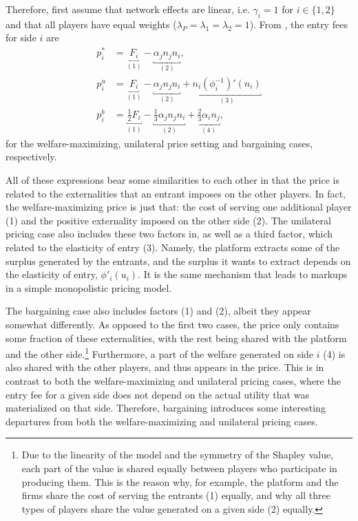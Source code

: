 \documentclass[a4paper]{article}
\begin{document}
Therefore, first assume that network effects are linear, i.e. $\gamma_i = 1$ for $i \in \{1, 2\}$ and that all players have equal weights ($\lambda_P = \lambda_1 = \lambda_2 = 1$).
From , the entry fees for side $i$ are
\begin{align*}
    p_i^* &= \underbracket{F_i}_{(1)} - \underbracket{\alpha_j n_j n_i}_{(2)}, \\
    p_i^u &= \underbracket{F_i}_{(1)} - \underbracket{\alpha_j n_j n_i}_{(2)} + \underbracket{n_i (\phi_i^{-1})'(n_i)}_{(3)} \\
    p_i^b &= \underbracket{\frac{1}{2} F_i}_{(1)} - \underbracket{\frac{1}{3} \alpha_j n_j n_i}_{(2)} + \underbracket{\frac{2}{3} \alpha_i n_j}_{(4)},
\end{align*}
for the welfare-maximizing, unilateral price setting and bargaining cases, respectively.

All of these expressions bear some similarities to each other in that the price is related to the externalities that an entrant imposes on the other players.
In fact, the welfare-maximizing price is just that: the cost of serving one additional player (1) and the positive externality imposed on the other side (2).
The unilateral pricing case also includes these two factors in, as well as a third factor, which related to the elasticity of entry (3).
Namely, the platform extracts some of the surplus generated by the entrants, and the surplus it wants to extract depends on the elasticity of entry, $\phi'_i(u_i)$.
It is the same mechanism that leads to markups in a simple monopolistic pricing model.

The bargaining case also includes factors (1) and (2), albeit they appear somewhat differently.
As opposed to the first two cases, the price only contains some fraction of these externalities, with the rest being shared with the platform and the other side.\footnote{
    Due to the linearity of the model and the symmetry of the Shapley value, each part of the value is shared equally between players who participate in producing them.
    This is the reason why, for example, the platform and the firms share the cost of serving the entrants (1) equally, and why all three types of players share the value generated on a given side (2) equally.
}
Furthermore, a part of the welfare generated on side $i$ (4) is also shared with the other players, and thus appears in the price.
This is in contrast to both the welfare-maximizing and unilateral pricing cases, where the entry fee for a given side does not depend on the actual utility that was materialized on that side.
Therefore, bargaining introduces some interesting departures from both the welfare-maximizing and unilateral pricing cases.
\end{document}
